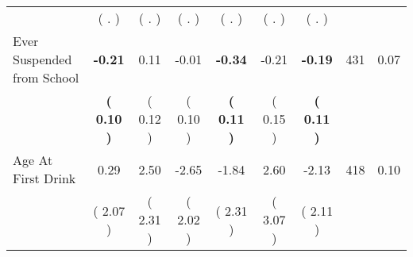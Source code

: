 \begin{tabular}{lcccccccc}
 & (        . ) & (        . ) & (        . ) & (        . ) & (        . ) & (        . ) & \\
Ever Suspended from School & \textbf{    -0.21} &      0.11 &     -0.01 & \textbf{    -0.34} &     -0.21 & \textbf{    -0.19} & 431 &       0.07 \\ 
 & \textbf{(     0.10 )} & (     0.12 ) & (     0.10 ) & \textbf{(     0.11 )} & (     0.15 ) & \textbf{(     0.11 )} & \\
Age At First Drink &      0.29 &      2.50 &     -2.65 &     -1.84 &      2.60 &     -2.13 & 418 &       0.10 \\ 
 & (     2.07 ) & (     2.31 ) & (     2.02 ) & (     2.31 ) & (     3.07 ) & (     2.11 ) & \\
\bottomrule
\end{tabular}
